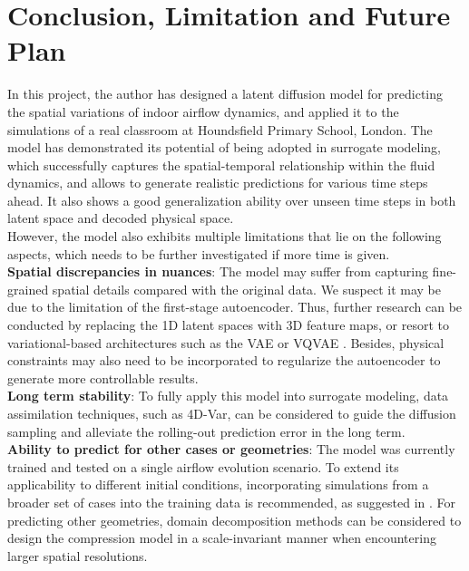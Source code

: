 \documentclass[final-report]{article-template}
\begin{document}
\section{Conclusion, Limitation and Future Plan}
In this project, the author has designed a latent diffusion model for predicting the spatial variations of indoor airflow dynamics, and applied it to the simulations of a real classroom at Houndsfield Primary School, London. The model has demonstrated its potential of being adopted in surrogate modeling, which successfully captures the spatial-temporal relationship within the fluid dynamics, and allows to generate realistic predictions for various time steps ahead. It also shows a good generalization ability over unseen time steps in both latent space and decoded physical space.\\

However, the model also exhibits multiple limitations that lie on the following aspects, which needs to be further investigated if more time is given.\\

\textbf{Spatial discrepancies in nuances}: The model may suffer from capturing fine-grained spatial details compared with the original data. We suspect it may be due to the limitation of the first-stage autoencoder. Thus, further research can be conducted by replacing the 1D latent spaces with 3D feature maps, or resort to variational-based architectures such as the VAE or VQVAE \cite{van2017neural, rombach2022highresolution}. Besides, physical constraints may also need to be incorporated to regularize the autoencoder to generate more controllable results.\\ 

\textbf{Long term stability}: To fully apply this model into surrogate modeling, data assimilation techniques, such as 4D-Var, can be considered to guide the diffusion sampling and alleviate the rolling-out prediction error in the long term.\\  

\textbf{Ability to predict for other cases or geometries}: The model was currently trained and tested on a single airflow evolution scenario. To extend its applicability to different initial conditions, incorporating simulations from a broader set of cases into the training data is recommended, as suggested in \cite{yang2023denoising}. For predicting other geometries, domain decomposition methods can be considered to design the compression model in a scale-invariant manner when encountering larger spatial resolutions. 
\end{document}
